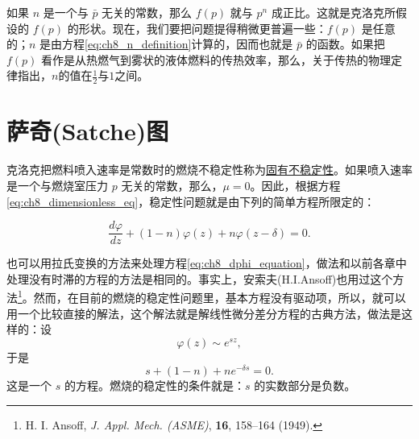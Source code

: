 如果 $ n $ 是一个与 $ \bar{p} $ 无关的常数，那么 $ f(p) $ 就与 $ p^n $ 成正比。这就是克洛克所假设的 $ f(p) $ 的形状。现在，我们要把问题提得稍微更普遍一些：$ f(p) $ 是任意的；$ n $ 是由方程\eqref{eq:ch8_n_definition}计算的，因而也就是 $ \bar{p} $ 的函数。如果把 $ f(p) $ 看作是从热燃气到雾状的液体燃料的传热效率，那么，关于传热的物理定律指出，$n$的值在$\frac{1}{2}$与$1$之间。

\section{萨奇(Satche)图}

克洛克把燃料喷入速率是常数时的燃烧不稳定性称为\underline{固有不稳定性}。如果喷入速率是一个与燃烧室压力 $p$ 无关的常数，那么，$\mu = 0$。因此，根据方程\eqref{eq:ch8_dimensionless_eq}，稳定性问题就是由下列的简单方程所限定的：

\begin{equation}\label{eq:ch8_dphi_equation}
\frac{d\varphi}{dz} + (1 - n)\varphi(z) + n\varphi(z - \delta) = 0.
\end{equation}

也可以用拉氏变换的方法来处理方程\eqref{eq:ch8_dphi_equation}，做法和以前各章中处理没有时滞的方程的方法是相同的。事实上，安索夫(H.I.Ansoff)也用过这个方法\footnote{H. I. Ansoff, \textit{J. Appl. Mech. (ASME)}, \textbf{16}, 158--164 (1949).}。然而，在目前的燃烧的稳定性问题里，基本方程没有驱动项，所以，就可以用一个比较直接的解法，这个解法就是解线性微分差分方程的古典方法，做法是这样的：设
\begin{equation*}
\varphi(z) \sim e^{sz},
\end{equation*}
于是
\begin{equation}\label{eq:ch8_s_equation}
s + (1 - n) + n e^{-\delta s} = 0.
\end{equation}
这是一个 $s$ 的方程。燃烧的稳定性的条件就是：$s$ 的实数部分是负数。

